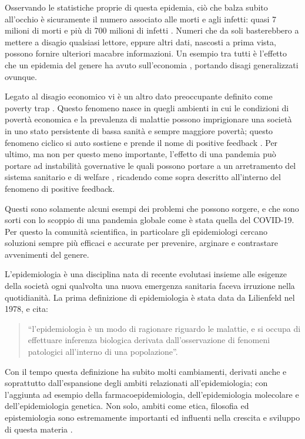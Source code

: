 Osservando le statistiche proprie di questa epidemia, 
ciò che balza subito all’occhio è sicuramente il numero 
associato alle morti e agli infetti: quasi 7 milioni di 
morti e più di 700 milioni di infetti \cite{world_health_organization}. 
Numeri che da soli basterebbero a mettere a disagio 
qualsiasi lettore, eppure altri dati, nascosti a prima 
vista, possono fornire ulteriori macabre informazioni. 
Un esempio tra tutti è l’effetto che un epidemia del 
genere ha avuto sull’economia \cite{world_bank_group_2023}, 
portando disagi generalizzati ovunque. 

Legato al disagio economico vi è un altro dato preoccupante 
definito come poverty trap \cite{wiki:Cycle_of_poverty}. 
Questo fenomeno nasce in quegli ambienti in cui le 
condizioni di povertà economica e la prevalenza di malattie 
possono imprigionare una società in uno stato persistente 
di bassa sanità e sempre maggiore povertà; 
questo fenomeno ciclico si auto sostiene e prende il nome 
di positive feedback \cite{wiki:Positive_feedback}. 
Per ultimo, ma non per questo meno importante, l’effetto di 
una pandemia può portare ad instabilità governative le 
quali possono portare a un arretramento del sistema 
sanitario e di welfare \cite{https://doi.org/10.1002/epa2.1152}, ricadendo come sopra descritto 
all’interno del fenomeno di positive feedback.

Questi sono solamente alcuni esempi dei problemi che 
possono sorgere, e che sono sorti con lo scoppio di una 
pandemia globale come è stata quella del COVID-19. 
Per questo la comunità scientifica, in particolare gli 
epidemiologi cercano soluzioni sempre più efficaci e 
accurate per prevenire, arginare e contrastare avvenimenti 
del genere.

L’epidemiologia è una disciplina nata di recente 
evolutasi insieme alle esigenze della società ogni 
qualvolta una nuova emergenza sanitaria faceva irruzione 
nella quotidianità. La prima definizione di epidemiologia 
è stata data da Lilienfeld \cite{10.1371/journal.pone.0208442} 
nel 1978, e cita: 

\begin{quotation}
    “l’epidemiologia è un modo di ragionare riguardo le 
    malattie, e si occupa di effettuare inferenza biologica 
    derivata dall’osservazione di fenomeni patologici 
    all’interno di una popolazione”.
\end{quotation}

Con il tempo questa definizione ha subito molti cambiamenti, 
derivati anche e soprattutto dall’espansione degli ambiti 
relazionati all’epidemiologia; con l’aggiunta ad esempio 
della farmacoepidemiologia, dell’epidemiologia molecolare 
e dell’epidemiologia genetica. Non solo, ambiti come etica, 
filosofia ed epistemiologia sono estremamente importanti 
ed influenti nella crescita e sviluppo di questa materia \cite{10.1371/journal.pone.0208442}. 

